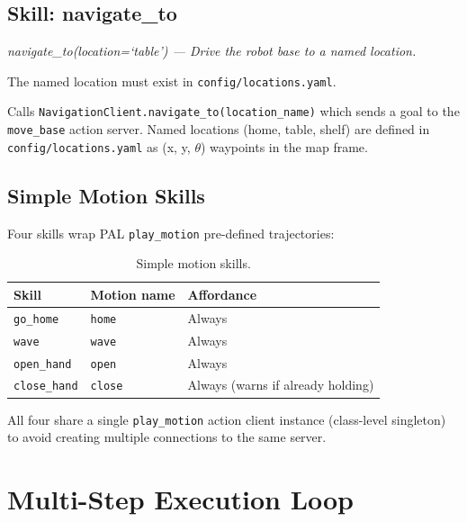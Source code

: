 \subsection{Skill: navigate\_to}

\begin{description}[noitemsep]
  \item[Description shown to VLM:] \textit{navigate\_to(location=\textquoteleft table\textquoteright)
    --- Drive the robot base to a named location.}
  \item[Affordance check:] The named location must exist in \texttt{config/locations.yaml}.
  \item[Execution:] Calls \texttt{NavigationClient.navigate\_to(location\_name)}
    which sends a goal to the \texttt{move\_base} action server.
    Named locations (home, table, shelf) are defined in \texttt{config/locations.yaml}
    as (x, y, $\theta$) waypoints in the map frame.
\end{description}

\subsection{Simple Motion Skills}

Four skills wrap PAL \texttt{play\_motion} pre-defined trajectories:

\begin{table}[H]
\centering
\caption{Simple motion skills.}
\label{tab:simple_skills}
\begin{tabular}{lll}
\toprule
\textbf{Skill} & \textbf{Motion name} & \textbf{Affordance} \\
\midrule
\texttt{go\_home}   & \texttt{home}  & Always \\
\texttt{wave}       & \texttt{wave}  & Always \\
\texttt{open\_hand} & \texttt{open}  & Always \\
\texttt{close\_hand}& \texttt{close} & Always (warns if already holding) \\
\bottomrule
\end{tabular}
\end{table}

All four share a single \texttt{play\_motion} action client instance (class-level
singleton) to avoid creating multiple connections to the same server.

\section{Multi-Step Execution Loop}

